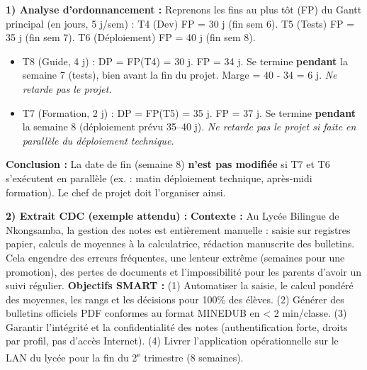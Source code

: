 \documentclass[11pt]{article}
\begin{document}
\begin{corrige}
\textbf{1) Analyse d'ordonnancement :}
Reprenons les fins au plus tôt (FP) du Gantt principal (en jours, 5 j/sem) :
T4 (Dev) FP = 30 j (fin sem 6). T5 (Tests) FP = 35 j (fin sem 7). T6 (Déploiement) FP = 40 j (fin sem 8).
\begin{itemize}
\item T8 (Guide, 4 j) : DP = FP(T4) = 30 j. FP = 34 j. Se termine \textbf{pendant} la semaine 7 (tests), bien avant la fin du projet. Marge = 40 - 34 = 6 j. \emph{Ne retarde pas le projet.}
\item T7 (Formation, 2 j) : DP = FP(T5) = 35 j. FP = 37 j. Se termine \textbf{pendant} la semaine 8 (déploiement prévu 35--40 j). \emph{Ne retarde pas le projet si faite en parallèle du déploiement technique.}
\end{itemize}
\textbf{Conclusion :} La date de fin (semaine 8) \textbf{n'est pas modifiée} si T7 et T6 s'exécutent en parallèle (ex. : matin déploiement technique, après-midi formation). Le chef de projet doit l'organiser ainsi.

\textbf{2) Extrait CDC (exemple attendu) :}
\textbf{Contexte :} Au Lycée Bilingue de Nkongsamba, la gestion des notes est entièrement manuelle : saisie sur registres papier, calculs de moyennes à la calculatrice, rédaction manuscrite des bulletins. Cela engendre des erreurs fréquentes, une lenteur extrême (semaines pour une promotion), des pertes de documents et l'impossibilité pour les parents d'avoir un suivi régulier.
\textbf{Objectifs SMART :} (1) Automatiser la saisie, le calcul pondéré des moyennes, les rangs et les décisions pour 100\% des élèves. (2) Générer des bulletins officiels PDF conformes au format MINEDUB en < 2 min/classe. (3) Garantir l'intégrité et la confidentialité des notes (authentification forte, droits par profil, pas d'accès Internet). (4) Livrer l'application opérationnelle sur le LAN du lycée pour la fin du 2\textsuperscript{e} trimestre (8 semaines).
\end{corrige}
\end{document}

